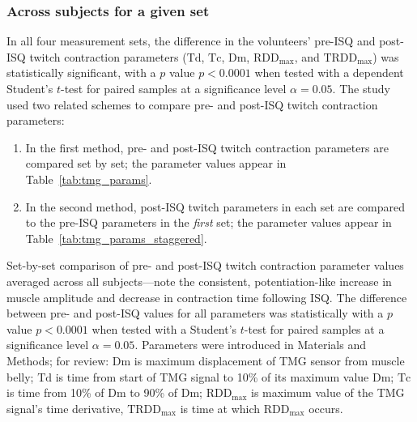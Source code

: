 \documentclass[utf8]{style/FrontiersinHarvard}
\newcommand{\Dm}{\ensuremath{\text{Dm}}\xspace}
\newcommand{\Td}{\ensuremath{\text{Td}}\xspace}
\newcommand{\Tc}{\ensuremath{\text{Tc}}\xspace}
\newcommand{\RDDMax}{\ensuremath{ \text{RDD}_{\text{max}}}\xspace}
\newcommand{\RDDMaxTime}{\ensuremath{ \text{TRDD}_{\text{max}}}\xspace}
\begin{document}
\subsubsection{Across subjects for a given set}
In all four measurement sets, the difference in the volunteers' pre-ISQ and post-ISQ twitch contraction parameters 
(\Td, \Tc, \Dm, \RDDMax, and \RDDMaxTime)
was statistically significant, with a $ p $ value $ p < 0.0001 $ when tested with a dependent Student's $ t $-test for paired samples at a significance level $ \alpha = 0.05 $.
The study used two related schemes to compare pre- and post-ISQ twitch contraction parameters:
\begin{enumerate}

    \item In the first method, pre- and post-ISQ twitch contraction parameters are compared set by set;
    the parameter values appear in Table~\ref{tab:tmg_params}.

    \item In the second method, post-ISQ twitch parameters in each set are compared to the pre-ISQ parameters in the \textit{first} set;
    the parameter values appear in Table~\ref{tab:tmg_params_staggered}.

\end{enumerate}

\begin{table}[htb!]
    \centering
    \caption{Set-by-set comparison of pre- and post-ISQ twitch contraction parameter values averaged across all subjects---note the consistent, potentiation-like increase in muscle amplitude and decrease in contraction time following ISQ.
    The difference between pre- and post-ISQ values for all parameters was statistically with a $ p $ value $ p < 0.0001 $ when tested with a Student's $ t $-test for paired samples at a significance level $ \alpha = 0.05 $.
    Parameters were introduced in Materials and Methods; for review:
    \Dm is maximum displacement of TMG sensor from muscle belly;
    \Td is time from start of TMG signal to 10\% of its maximum value \Dm;
    \Tc is time from 10\% of \Dm to 90\% of \Dm;
    \RDDMax is maximum value of the TMG signal's time derivative,
    \RDDMaxTime is time at which \RDDMax occurs.
    }
    \vspace{1ex}

    \renewcommand{\arraystretch}{1.2}
    
    \label{tab:tmg_params}
\end{table}
\end{document}
